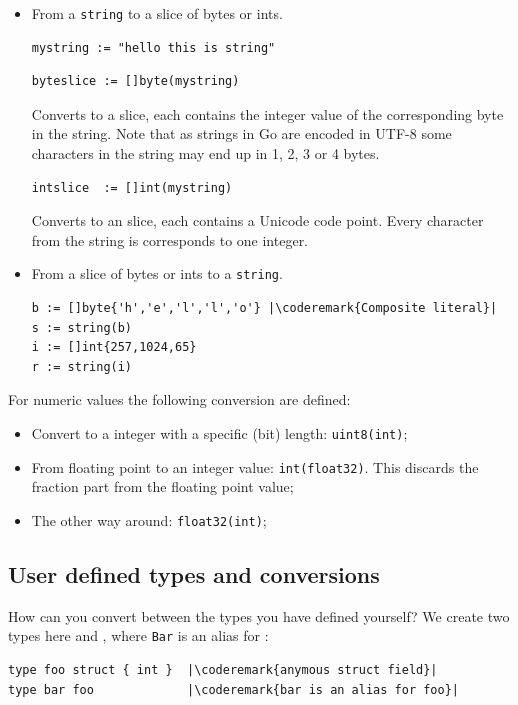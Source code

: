 \begin{table}[H]
\begin{center}
\caption[Valid conversions]{Valid conversions, 
\lstinline{float64} works the same as \lstinline{float32}}
\label{tab:convesion}

\end{center}
\end{table}

\begin{itemize}
\item{
From a \lstinline{string} to a slice of bytes or ints.
\begin{lstlisting}
mystring := "hello this is string"
\end{lstlisting}

\begin{lstlisting}
byteslice := []byte(mystring)
\end{lstlisting}
Converts to a  slice, each  contains the integer value
of the corresponding byte in the string. Note that as strings in Go
are encoded in UTF-8 some characters in the string may end up in 1, 2, 3
or 4 bytes.
\begin{lstlisting}
intslice  := []int(mystring)
\end{lstlisting}
Converts to an  slice, each  contains a Unicode code
point. Every character from the string is corresponds to one integer.
}
\item{
From a slice of bytes or ints to a \lstinline{string}.
\begin{lstlisting}
b := []byte{'h','e','l','l','o'} |\coderemark{Composite literal}|
s := string(b)
i := []int{257,1024,65} 
r := string(i)
\end{lstlisting}
}
\end{itemize}
For numeric values the following conversion are defined:
\begin{itemize}
\item{Convert to a integer with a specific (bit) length: 
\lstinline{uint8(int)};}
\item{From floating point to an integer value: 
\lstinline{int(float32)}. This discards the fraction part
from the floating point value;}
\item{The other way around: \lstinline{float32(int)};}
\end{itemize}

\subsection{User defined types and conversions}
How can you convert between the types you have defined
yourself?
We create two types here  and , where
\lstinline{Bar} is an alias for :
\begin{lstlisting}
type foo struct { int }  |\coderemark{anymous struct field}|
type bar foo             |\coderemark{bar is an alias for foo}|
\end{lstlisting}

